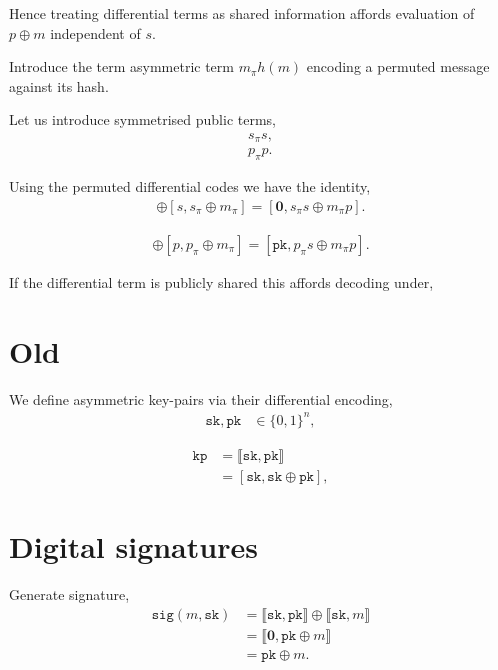 \documentclass[twocolumn, aps, amsmath, amssymb, nofootinbib, superscriptaddress, longbibliography, doublefloatfix, table-of-contents, eqsecnum, rmp]{revtex4-2}
\def\sk{\mathtt{sk}}
\def\pk{\mathtt{pk}}
\def\kp{\mathtt{kp}}
\def\sig{\mathtt{sig}}
\def\diff#1#2{\llbracket #1,#2\rrbracket}
\begin{document}
Hence treating differential terms as shared information affords evaluation of $p\oplus m$ independent of $s$.

Introduce the term asymmetric term $m_\pi h(m)$ encoding a permuted message against its hash.


Let us introduce symmetrised public terms,
\begin{align}
	s_\pi s, \nonumber\\
	p_\pi p.	
\end{align}

Using the permuted differential codes we have the identity,
\begin{align}
	[s,s \oplus p] \oplus [s, s_\pi \oplus m_\pi] = [\mathbf{0}, s_\pi s \oplus m_\pi p].
\end{align}

\begin{align}
	[s,s \oplus p] \oplus [p,p_\pi \oplus m_\pi] = [\mathtt{pk}, p_\pi s \oplus m_\pi p].
\end{align}

If the differential term is publicly shared this affords decoding under,

\section{Old}

We define asymmetric key-pairs via their differential encoding,
\begin{align}
	\mathtt{sk}, \mathtt{pk} &\in \{0,1\}^n,
\end{align}

\begin{align}
	\kp &= \diff{\sk}{\pk} \nonumber\\
	&= [\sk,\sk \oplus \pk],
\end{align}

\section{Digital signatures}

Generate signature,
\begin{align}
	\sig(m,\sk) &= \diff{\sk}{\pk} \oplus \diff{\sk}{m} \nonumber\\
	&= \diff{\mathbf{0}}{\pk\oplus m} \nonumber\\
	&= \pk \oplus m.
\end{align}
\end{document}
